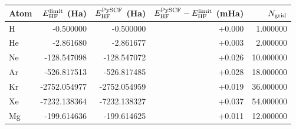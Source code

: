 \begin{tabular}{@{}lrrrr@{}}
\toprule
Atom & $E_{\rm HF}^{\rm limit}$ (Ha) & $E_{\rm HF}^{\rm PySCF}$ (Ha) & $E_{\rm HF}^{\rm PySCF}-E_{\rm HF}^{\rm limit}$ (mHa) & $N_{\rm grid}$ \\
\midrule
H & -0.500000 & \textcolor{pyscfred}{-0.500000} & \textcolor{pyscfred}{+0.000} & \textcolor{pyscfred}{1.000000} \\
He & -2.861680 & \textcolor{pyscfred}{-2.861677} & \textcolor{pyscfred}{+0.003} & \textcolor{pyscfred}{2.000000} \\
Ne & -128.547098 & \textcolor{pyscfred}{-128.547072} & \textcolor{pyscfred}{+0.026} & \textcolor{pyscfred}{10.000000} \\
Ar & -526.817513 & \textcolor{pyscfred}{-526.817485} & \textcolor{pyscfred}{+0.028} & \textcolor{pyscfred}{18.000000} \\
Kr & -2752.054977 & \textcolor{pyscfred}{-2752.054959} & \textcolor{pyscfred}{+0.019} & \textcolor{pyscfred}{36.000000} \\
Xe & -7232.138364 & \textcolor{pyscfred}{-7232.138327} & \textcolor{pyscfred}{+0.037} & \textcolor{pyscfred}{54.000000} \\
Mg & -199.614636 & \textcolor{pyscfred}{-199.614625} & \textcolor{pyscfred}{+0.011} & \textcolor{pyscfred}{12.000000} \\
\bottomrule
\end{tabular}
